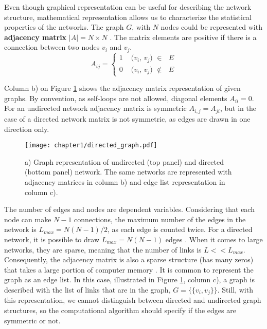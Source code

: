 Even though graphical representation can be useful for describing the network structure, mathematical representation allows us to characterize the statistical properties of the networks. The graph $G$, with $N$ nodes could be represented with \textbf{adjacency matrix} $|A| = N \times N$ \cite{boccaletti2006complex}. The matrix elements are positive if there is a connection between two nodes $v_i$ and $v_j$. 
\begin{equation}
A_{ij} =
\begin{cases}
1 & \text{ ($v_i$, $v_j$) $\in$ $E$}\\
0 & \text{ ($v_i$, $v_j$) $\notin$ $E$}
\end{cases}       
\end{equation}

Column b) on Figure \ref{fig:graph_dir} shows the adjacency matrix representation of given graphs. By convention, as self-loops are not allowed, diagonal elements $A_{ii}=0$. For an undirected network adjacency matrix is symmetric $A_{i,j}=A_{ji}$, but in the case of a directed network matrix is not symmetric, as edges are drawn in one direction only.  

\begin{figure}[h]
	\centering
	\texttt{[image: chapter1/directed\_graph.pdf]} 
	\caption[Graph, matrix and edge list representations.]{a) Graph representation of undirected (top panel) and directed (bottom panel) network. The same networks are represented with adjacency matrices in column b) and edge list representation in column c).}
	\label{fig:graph_dir}
\end{figure}

The number of edges and nodes are dependent variables. Considering that each node can make $N-1$ connections, the maximum number of the edges in the network is $L_{max}=N(N-1)/2$, as each edge is counted twice. For a directed network, it is possible to draw $L_{max}=N(N-1)$ edges \cite{caldarelli2007scalefree}. When it comes to large networks, they are sparse, meaning that the number of links is $L<<L_{max}$. Consequently, the adjacency matrix is also a sparse structure (has many zeros) that takes a large portion of computer memory \cite{barabasi2016network}. 
It is common to represent the graph as an edge list. In this case, illustrated in Figure \ref{fig:graph_dir}, column c), a graph is described with the list of links that are in the graph, $G = \{ \{v_i,v_j\}\}$. Still, with this representation, we cannot distinguish between directed and undirected graph structures, so the computational algorithm should specify if the edges are symmetric or not.  

